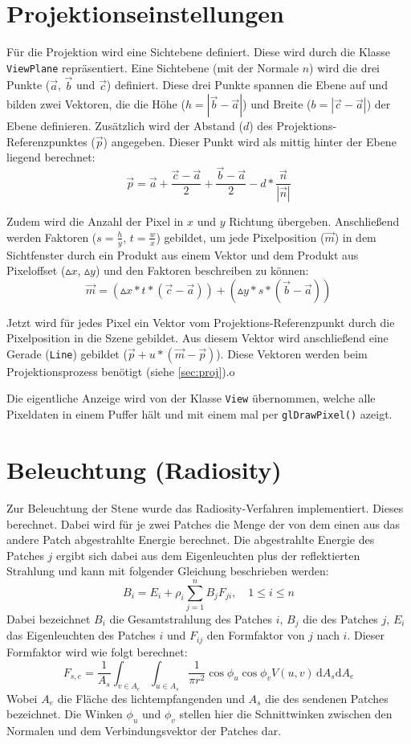 \documentclass[final,a4paper,11pt,notitlepage,halfparskip]{scrreprt}
\begin{document}
\section{Projektionseinstellungen}
Für die Projektion wird eine Sichtebene definiert. Diese wird durch die Klasse
\texttt{ViewPlane} repräsentiert. Eine Sichtebene (mit der Normale $n$) wird die 
drei Punkte ($\vec{a}$, $\vec{b}$ und $\vec{c}$) definiert. Diese drei Punkte 
spannen die Ebene auf und bilden zwei Vektoren, die die Höhe ($h = |\vec{b} - \vec{a}|$) 
und Breite ($b = |\vec{c} - \vec{a}|$) der Ebene definieren. Zusätzlich wird 
der Abstand ($d$) des Projektions-Referenzpunktes ($\vec{p}$) angegeben. Dieser 
Punkt wird als mittig hinter der Ebene liegend berechnet:
$$\vec{p} = \vec{a} + \frac{\vec{c} - \vec{a}}{2} + \frac{\vec{b} - \vec{a}}{2}
- d * \frac{\vec{n}}{|\vec{n}|}$$

Zudem wird die Anzahl der Pixel in $x$ und $y$ Richtung übergeben. Anschließend 
werden Faktoren ($s = \frac{h}{y}$, $t = \frac{w}{x}$) gebildet, um jede 
Pixelposition ($\vec{m}$) in dem Sichtfenster durch ein Produkt aus einem Vektor 
und dem Produkt aus Pixeloffset ($\vartriangle x$, $\vartriangle y$) und den 
Faktoren beschreiben zu können:
$$\vec{m} = (\vartriangle x * t * (\vec{c} - \vec{a})) + (\vartriangle y * s * 
(\vec{b} - \vec{a}))$$

Jetzt wird für jedes Pixel ein Vektor vom Projektions-Referenzpunkt durch die
Pixelposition in die Szene gebildet. Aus diesem Vektor wird anschließend eine
Gerade (\texttt{Line}) gebildet ($\vec{p} + u * (\vec{m} - \vec{p})$). Diese
Vektoren werden beim Projektionsprozess benötigt (siehe \ref{sec:proj}).o

Die eigentliche Anzeige wird von der Klasse \texttt{View} übernommen, welche
alle Pixeldaten in einem Puffer hält und mit einem mal per 
\texttt{glDrawPixel()} azeigt.

\section{Beleuchtung (Radiosity)}
Zur Beleuchtung der Stene wurde das Radiosity-Verfahren implementiert. Dieses
berechnet. Dabei wird für je zwei Patches die Menge der von dem einen aus das
andere Patch abgestrahlte Energie berechnet. Die abgestrahlte Energie des
Patches $j$ ergibt sich dabei aus dem Eigenleuchten plus der reflektierten 
Strahlung und kann mit folgender Gleichung beschrieben werden:
$$B_i = E_i + \rho_i \sum_{j=1}^n B_jF_{ji},\quad 1 \le i \le n$$
Dabei bezeichnet $B_i$ die Gesamtstrahlung des Patches $i$, $B_j$ die des
Patches $j$, $E_i$ das Eigenleuchten des Patches $i$ und $F_{ij}$ den Formfaktor
von $j$ nach $i$. Dieser Formfaktor wird wie folgt berechnet:
$$F_{s,e} = \frac{1}{A_s}\int_{v\in A_e}\int_{u\in A_s} \frac{1}{\pi r^2} 
\cos\phi_u\cos\phi_v V(u,v) \,\mathrm dA_s \mathrm dA_e$$
Wobei $A_{e}$ die Fläche des lichtempfangenden und $A_s$ die des sendenen
Patches bezeichnet. Die Winken $\phi_u$ und $\phi_v$ stellen hier die
Schnittwinken zwischen den Normalen und dem Verbindungsvektor der Patches dar.
\end{document}

